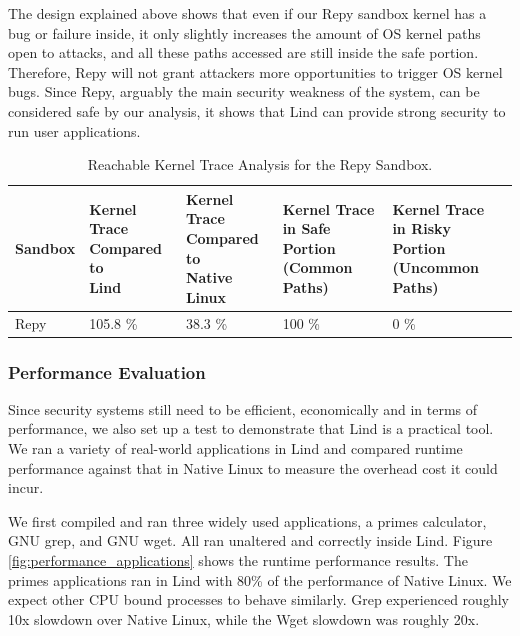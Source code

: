 The design explained above shows that even if our Repy sandbox kernel has a
bug or failure inside, 
it only slightly increases the amount of OS kernel paths open to attacks,
and all these paths accessed are still inside the safe portion. 
Therefore, Repy will not grant attackers more opportunities to trigger OS
kernel bugs. 
Since Repy, arguably the main security weakness of the system, can be
considered safe by our analysis, 
it shows that Lind can provide strong security to run user applications.

\begin{table}
\centering
\scriptsize
\begin{tabular}{|l|l|l|l|l|}
  \hline
  Sandbox &  \thead{Kernel Trace \\ Compared to \\ Lind} & \thead{Kernel
Trace \\ Compared to \\ Native Linux} &
  \thead{Kernel Trace \\ in Safe Portion \\ (Common Paths)} & \thead{Kernel
Trace \\ in Risky Portion \\ (Uncommon Paths)} \\
  \hline
  Repy & 105.8 \% & 38.3 \% & 100 \%  & 0 \%  \\
  \hline
\end{tabular}
\caption{Reachable Kernel Trace Analysis for the Repy Sandbox.  }
\label{table:trace-Repy}
\end{table}

\subsubsection{Performance Evaluation}
\label{Performance-Evaluation}

Since security systems still need to be efficient, economically and in
terms of performance, 
we also set up a test to demonstrate that Lind is a practical tool. 
We ran a variety of real-world applications in Lind and compared runtime
performance 
against that in Native Linux to measure the overhead cost it could incur.

We first compiled and ran three widely used applications, 
a primes calculator, GNU grep, and GNU wget. All ran unaltered and
correctly inside Lind. 
Figure \ref{fig:performance_applications} shows the runtime performance
results. 
The primes applications ran in Lind with 80\% of the performance of Native 
Linux.  
We expect other CPU bound processes to behave similarly. 
Grep experienced roughly 10x slowdown over Native Linux, while the Wget
slowdown was roughly 20x. 

